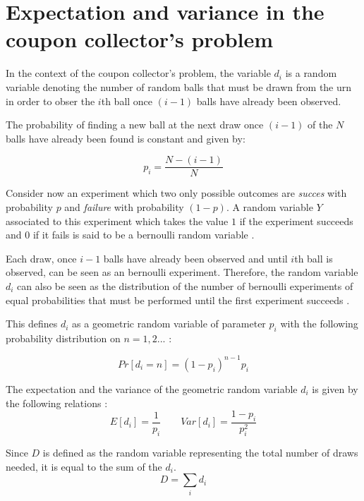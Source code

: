 \chapter{Expectation and variance in the coupon collector's problem} \label{app:coupon_collector}

In the context of the coupon collector's problem, the variable $d_i$ is a random variable denoting the number of random balls that must be drawn from the urn in order to obser the $i$th ball once $(i-1)$ balls have already been observed.

The probability of finding a new ball at the next draw once $(i-1)$ of the $N$ balls have already been found is constant and given by:

\begin{equation}
    p_i = \frac{N - (i-1)}{N}
\end{equation}

Consider now an experiment which two only possible outcomes are \textit{succes} with probability $p$ and \textit{failure} with probability $(1-p)$.
A random variable $Y$ associated to this experiment which takes the value $1$ if the experiment succeeds and $0$ if it fails is said to be a bernoulli random variable \cite{Mitzenmacher:2005:PCR:1076315}.

Each draw, once $i-1$ balls have already been observed and until $i$th ball is observed, can be seen as an bernoulli experiment.
Therefore, the random variable $d_i$ can also be seen as the distribution of the number of bernoulli experiments of equal probabilities that must be performed until the first experiment succeeds \cite{Mitzenmacher:2005:PCR:1076315}.

This defines $d_i$ as a geometric random variable of parameter $p_i$ with the following probability distribution on $n=1,2...$ \cite{Mitzenmacher:2005:PCR:1076315}:

\begin{equation}
    Pr[d_i = n] = (1 - p_i)^{n-1}p_i
    \label{eqn:geometric_di}
\end{equation}

The expectation and the variance of the geometric random variable $d_i$ is given by the following relations \cite{Mitzenmacher:2005:PCR:1076315}:
\begin{equation}
    E[d_i] = \frac{1}{p_i} \qquad Var[d_i] = \frac{1-p_i}{p_i^2}
    \label{eqn:expectancy_var_di}
\end{equation}

Since $D$ is defined as the random variable representing the total number of draws needed, it is equal to the sum of the $d_i$. 
\begin{equation}
    D=\sum_i d_i 
\end{equation}
    
